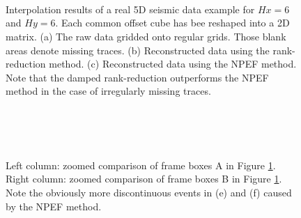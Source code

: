 {\begin{figure}[htb!]
    \centering
    \\
    \\
    \\
	\caption{Interpolation results of a real 5D seismic data example for $Hx=6$ and $Hy=6$. Each common offset cube has bee reshaped into a 2D matrix. (a) The raw data gridded onto regular grids. Those blank areas denote missing traces. (b) Reconstructed data using the rank-reduction method. (c) Reconstructed data using the NPEF method. Note that the damped rank-reduction outperforms the NPEF method in the case of irregularly missing traces.}
	\label{fig:r_obs5d4,r_drr5d4,r_npef5d4}
\end{figure}



\begin{figure}[htb!]
    \centering
    \\
    \\
    \\
	\caption{Left column: zoomed comparison of frame boxes A in Figure \ref{fig:r_obs5d4,r_drr5d4,r_npef5d4}. Right column: zoomed comparison of frame boxes B in Figure \ref{fig:r_obs5d4,r_drr5d4,r_npef5d4}. Note the obviously more discontinuous events in (e) and (f) caused by the NPEF method.}
	\label{fig:r_obs5d2a,r_obs5d2b,r_drr5d2a,r_drr5d2b,r_npef5d2a,r_npef5d2b}
\end{figure}


}
